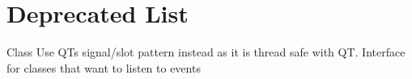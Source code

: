 \chapter{Deprecated List}
\hypertarget{deprecated}{}\label{deprecated}

\begin{DoxyRefList}
\item[Class \doxylink{class_deprecated_event_listener}{Deprecated\+Event\+Listener} ]\label{deprecated__deprecated000001}%
%
Use QT\textquotesingle{}s signal/slot pattern instead as it is thread safe with QT. Interface for classes that want to listen to events 
\end{DoxyRefList}